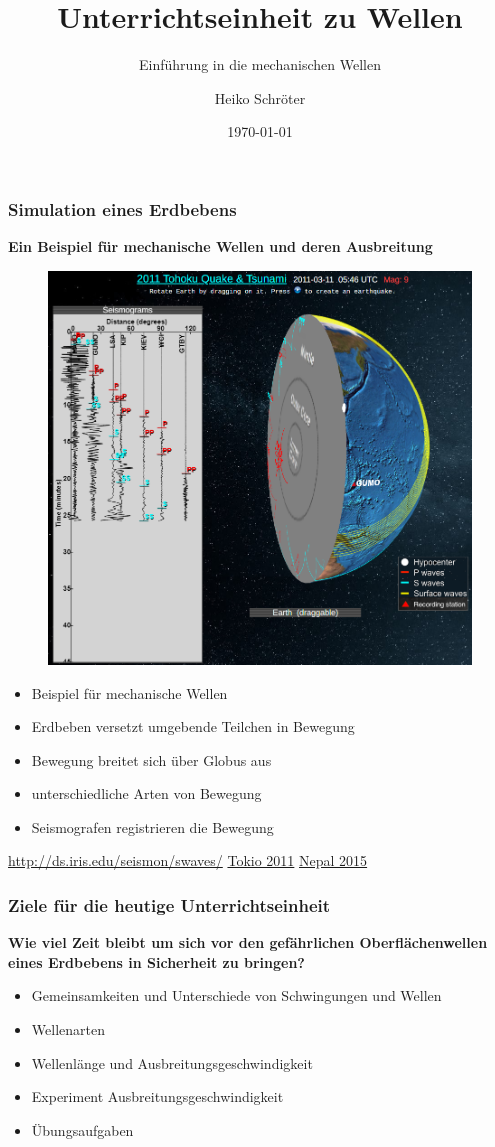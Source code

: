 \documentclass{beamer}
\title{Unterrichtseinheit zu Wellen}
\subtitle{Einführung in die mechanischen Wellen}
\author{Heiko Schröter}
\date{\today}
\begin{document}
\frame{\titlepage}

\frame
{
  \frametitle{Simulation eines Erdbebens}
  \textbf{Ein Beispiel für mechanische Wellen und deren Ausbreitung}
	\begin{figure}
	\includegraphics[scale=0.15]{iris}
	\end{figure}
	\begin{itemize}
	\item Beispiel für mechanische Wellen
	\item Erdbeben versetzt umgebende Teilchen in Bewegung
	\item Bewegung breitet sich über Globus aus
	\item unterschiedliche Arten von Bewegung
	\item Seismografen registrieren die Bewegung
	\end{itemize}
	\url{http://ds.iris.edu/seismon/swaves/}
	\href{file:///home/heikoneu/Dokumente/latex/FOS_12_L/videos/2021-03-14 15-57-49.mp4}{Tokio 2011} \quad \href{file:///home/heikoneu/Dokumente/latex/FOS_12_L/videos/Nepal_2015.mp4}{Nepal 2015}
}

\frame
{
  \frametitle{Ziele für die heutige Unterrichtseinheit}
  \textbf{Wie viel Zeit bleibt um sich vor den gefährlichen Oberflächenwellen eines Erdbebens in Sicherheit zu bringen?}
  \begin{itemize}
	\item Gemeinsamkeiten und Unterschiede von Schwingungen und Wellen
	\item Wellenarten
	\item Wellenlänge und Ausbreitungsgeschwindigkeit
	\item Experiment Ausbreitungsgeschwindigkeit
	\item Übungsaufgaben
  \end{itemize}
}
\end{document}
